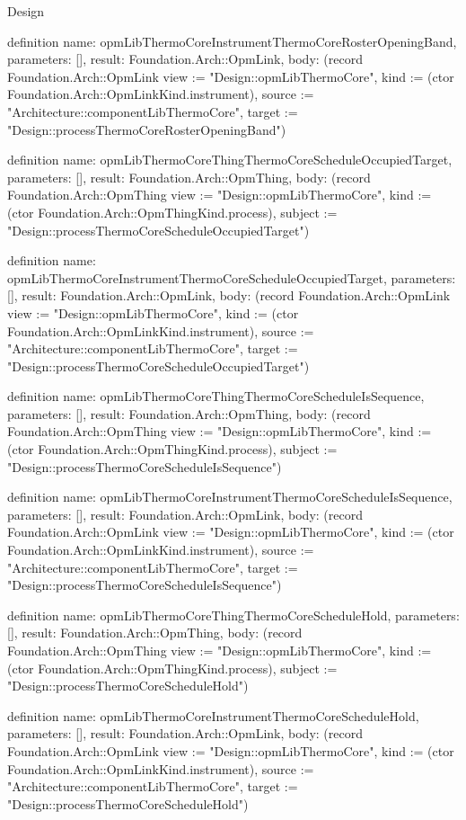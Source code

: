 \begin{lexlean}{Design}
\begin{semanticmodule}
definition{
  name: opmLibThermoCoreInstrumentThermoCoreRosterOpeningBand,
  parameters: [],
  result: Foundation.Arch::OpmLink,
  body: (record Foundation.Arch::OpmLink {view := "Design::opmLibThermoCore", kind := (ctor Foundation.Arch::OpmLinkKind.instrument), source := "Architecture::componentLibThermoCore", target := "Design::processThermoCoreRosterOpeningBand"})
}

definition{
  name: opmLibThermoCoreThingThermoCoreScheduleOccupiedTarget,
  parameters: [],
  result: Foundation.Arch::OpmThing,
  body: (record Foundation.Arch::OpmThing {view := "Design::opmLibThermoCore", kind := (ctor Foundation.Arch::OpmThingKind.process), subject := "Design::processThermoCoreScheduleOccupiedTarget"})
}

definition{
  name: opmLibThermoCoreInstrumentThermoCoreScheduleOccupiedTarget,
  parameters: [],
  result: Foundation.Arch::OpmLink,
  body: (record Foundation.Arch::OpmLink {view := "Design::opmLibThermoCore", kind := (ctor Foundation.Arch::OpmLinkKind.instrument), source := "Architecture::componentLibThermoCore", target := "Design::processThermoCoreScheduleOccupiedTarget"})
}

definition{
  name: opmLibThermoCoreThingThermoCoreScheduleIsSequence,
  parameters: [],
  result: Foundation.Arch::OpmThing,
  body: (record Foundation.Arch::OpmThing {view := "Design::opmLibThermoCore", kind := (ctor Foundation.Arch::OpmThingKind.process), subject := "Design::processThermoCoreScheduleIsSequence"})
}

definition{
  name: opmLibThermoCoreInstrumentThermoCoreScheduleIsSequence,
  parameters: [],
  result: Foundation.Arch::OpmLink,
  body: (record Foundation.Arch::OpmLink {view := "Design::opmLibThermoCore", kind := (ctor Foundation.Arch::OpmLinkKind.instrument), source := "Architecture::componentLibThermoCore", target := "Design::processThermoCoreScheduleIsSequence"})
}

definition{
  name: opmLibThermoCoreThingThermoCoreScheduleHold,
  parameters: [],
  result: Foundation.Arch::OpmThing,
  body: (record Foundation.Arch::OpmThing {view := "Design::opmLibThermoCore", kind := (ctor Foundation.Arch::OpmThingKind.process), subject := "Design::processThermoCoreScheduleHold"})
}

definition{
  name: opmLibThermoCoreInstrumentThermoCoreScheduleHold,
  parameters: [],
  result: Foundation.Arch::OpmLink,
  body: (record Foundation.Arch::OpmLink {view := "Design::opmLibThermoCore", kind := (ctor Foundation.Arch::OpmLinkKind.instrument), source := "Architecture::componentLibThermoCore", target := "Design::processThermoCoreScheduleHold"})
}


\end{semanticmodule}
\end{lexlean}
